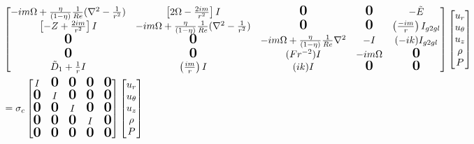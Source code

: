 \documentclass{article}
\newcommand{\bigzero}{\mbox{\normalfont\Large\bfseries 0}}
\begin{document}
\begin{align}\label{eq:hoc_interpolate_face_to_center_naive}
 \begin{split}
 &\begin{bmatrix}%
    -im\Omega +  \frac{\eta}{(1-\eta)} \frac{1}{Re} (\nabla^{2} - \frac{1}{r^{2}} ) 
  & \left[2\Omega - \frac{2im}{r^{2}}\right] I
  & \bigzero 
  & \bigzero
  & -\tilde{E}\\
\left[-Z + \frac{2im}{r^{2}}\right] I 
& -im\Omega +  \frac{\eta}{(1-\eta)} \frac{1}{Re}(\nabla^{2} - \frac{1}{r^{2}} )  
& \bigzero &  \bigzero & \left(\frac{-im}{r}\right)I_{g2gl}\\
%
  \bigzero  & \bigzero & -im\Omega +  \frac{\eta}{(1-\eta)} \frac{1}{Re} \nabla^{2}& -I & (-ik)I_{g2gl}\\
%
  \bigzero  & \bigzero  & (Fr^{-2})I  & -im\Omega & \bigzero\\
  \tilde{D}_{1} + \frac{1}{r}I & \left(\frac{im}{r}\right)I & (ik)I & \bigzero & \bigzero\\
\end{bmatrix}
\begin{bmatrix}
 u_{r}\\
 u_{\theta}\\
 u_{z}\\
 \rho\\
 P\\
 \end{bmatrix}\\
&= \sigma_{c} 
\begin{bmatrix}
 I & \bigzero & \bigzero & \bigzero & \bigzero\\
%
%
 \bigzero & I & \bigzero & \bigzero & \bigzero\\
%
%
  \bigzero & \bigzero & I & \bigzero & \bigzero\\
%
%
  \bigzero & \bigzero & \bigzero & I & \bigzero\\
%
  \bigzero & \bigzero & \bigzero & \bigzero & \bigzero\\
\end{bmatrix}
\begin{bmatrix}
 u_{r}\\
 u_{\theta}\\
 u_{z}\\
 \rho\\
 P\\
 \end{bmatrix}
 \end{split}
\end{align}
\end{document}
